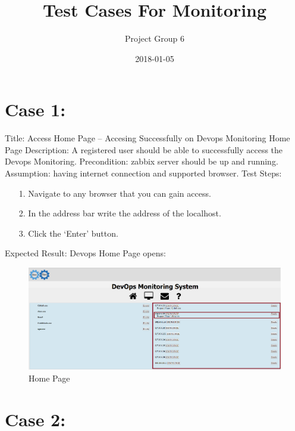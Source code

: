 \documentclass{article}
\newcommand*{\TitleFont}{%
	\usefont{\encodingdefault}{\rmdefault}{b}{n}%
	\fontsize{40}{20}%
	\selectfont}
\newcommand*{\SubTitleFont}{%
	\usefont{\encodingdefault}{\rmdefault}{b}{n}%
	\fontsize{24}{20}%
	\selectfont}
\begin{document}
	\title{\TitleFont Test Cases For Monitoring}
	\date{2018-01-05}
	\author{\SubTitleFont Project Group 6\\}
	\maketitle
	\newpage

	
	\section*{Case 1:}

	Title: Access Home Page – Accesing Successfully on Devops Monitoring Home Page
	\newline
	Description: A registered user should be able to successfully access the Devops Monitoring.
	\newline
	Precondition: zabbix server should be up and running.
	\newline
	Assumption: having internet connection and  supported browser.
	\newline
	\newline
	Test Steps:
	\begin{itemize}
\item[1.] Navigate to any browser that you can gain access.
\item[2.]In the address bar write the address of the localhost. 
\item[3.]Click the ‘Enter’ button.
	\end{itemize}
	Expected Result: Devops Home Page opens:
	
	\begin{figure}[H]
		\centering
		\includegraphics[scale=0.3,width=\linewidth]{1}
		\caption{Home Page}
	\end{figure}
	
	
\section*{Case 2:}
 	
\end{document}
